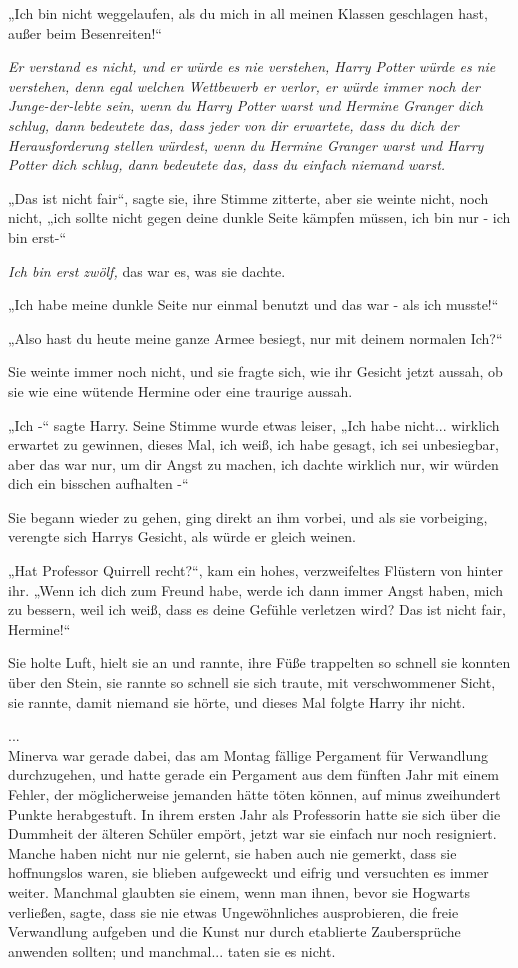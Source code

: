 {„Ich bin nicht weggelaufen, als du mich in all meinen Klassen geschlagen hast, außer beim Besenreiten!“

\emph{Er verstand es nicht, und er würde es nie verstehen, Harry Potter würde es nie verstehen, denn egal welchen Wettbewerb er verlor, er würde immer noch der Junge-der-lebte sein, wenn du Harry Potter warst und Hermine Granger dich schlug, dann bedeutete das, dass jeder von dir erwartete, dass du dich der Herausforderung stellen würdest, wenn du Hermine Granger warst und Harry Potter dich schlug, dann bedeutete das, dass du einfach niemand warst.}

„Das ist nicht fair“, sagte sie, ihre Stimme zitterte, aber sie weinte nicht, noch nicht, „ich sollte nicht gegen deine dunkle Seite kämpfen müssen, ich bin nur - ich bin erst-“

\emph{Ich bin erst zwölf,} das war es, was sie dachte.

„Ich habe meine dunkle Seite nur einmal benutzt und das war - als ich musste!“

„Also hast du heute meine ganze Armee besiegt, nur mit deinem normalen Ich?“

Sie weinte immer noch nicht, und sie fragte sich, wie ihr Gesicht jetzt aussah, ob sie wie eine wütende Hermine oder eine traurige aussah.

„Ich -“ sagte Harry. Seine Stimme wurde etwas leiser, „Ich habe nicht... wirklich erwartet zu gewinnen, dieses Mal, ich weiß, ich habe gesagt, ich sei unbesiegbar, aber das war nur, um dir Angst zu machen, ich dachte wirklich nur, wir würden dich ein bisschen aufhalten -“

Sie begann wieder zu gehen, ging direkt an ihm vorbei, und als sie vorbeiging, verengte sich Harrys Gesicht, als würde er gleich weinen.

„Hat Professor Quirrell recht?“, kam ein hohes, verzweifeltes Flüstern von hinter ihr. „Wenn ich dich zum Freund habe, werde ich dann immer Angst haben, mich zu bessern, weil ich weiß, dass es deine Gefühle verletzen wird? Das ist nicht fair, Hermine!“

Sie holte Luft, hielt sie an und rannte, ihre Füße trappelten so schnell sie konnten über den Stein, sie rannte so schnell sie sich traute, mit verschwommener Sicht, sie rannte, damit niemand sie hörte, und dieses Mal folgte Harry ihr nicht.

...\\ Minerva war gerade dabei, das am Montag fällige Pergament für Verwandlung durchzugehen, und hatte gerade ein Pergament aus dem fünften Jahr mit einem Fehler, der möglicherweise jemanden hätte töten können, auf minus zweihundert Punkte herabgestuft. In ihrem ersten Jahr als Professorin hatte sie sich über die Dummheit der älteren Schüler empört, jetzt war sie einfach nur noch resigniert. Manche haben nicht nur nie gelernt, sie haben auch nie gemerkt, dass sie hoffnungslos waren, sie blieben aufgeweckt und eifrig und versuchten es immer weiter. Manchmal glaubten sie einem, wenn man ihnen, bevor sie Hogwarts verließen, sagte, dass sie nie etwas Ungewöhnliches ausprobieren, die freie Verwandlung aufgeben und die Kunst nur durch etablierte Zaubersprüche anwenden sollten; und manchmal... taten sie es nicht.

}
